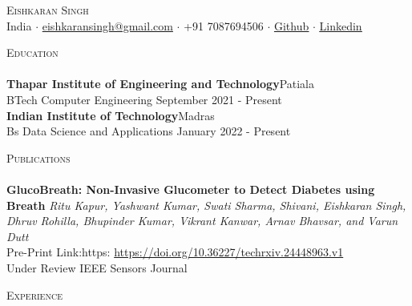 \documentclass[a4paper]{article}
\newcommand{\lineunder} {
    \vspace*{-8pt} \\
    \hspace*{-18pt} \hrulefill \\
}
\newcommand{\header} [1] {
    {\hspace*{-18pt}\vspace*{6pt} \textsc{#1}}
    \vspace*{-6pt} \lineunder
}
\begin{document}
\vspace*{-40pt}

    

\vspace*{-9pt}
\begin{center}
	{\Huge \scshape {Eishkaran Singh}}\\
	\vspace{1mm}
	India $\cdot$ \underline{eishkaransingh@gmail.com} $\cdot$ +91 7087694506 $\cdot$ \href{https://github.com/EISHKARAN}{\underline{Github}} $\cdot$ \href{https://www.linkedin.com/in/eishkaran-singh/}{\underline{Linkedin}} \\
\end{center}
\vspace{-2mm}
\header{Education}
\vspace{0.5mm}
\textbf{Thapar Institute of Engineering and Technology}\hfill Patiala\\
BTech Computer  Engineering \hfill September 2021 - Present\\
\vspace{0.5mm}
\textbf{Indian Institute of Technology}\hfill Madras\\
Bs Data Science and Applications \hfill January 2022 - Present\\
\vspace{-0.5mm}
\header{Publications}
\vspace{-0.5mm}
\textbf{GlucoBreath: Non-Invasive Glucometer to Detect Diabetes using Breath}
    {\textit{Ritu Kapur, Yashwant Kumar, Swati Sharma, Shivani, Eishkaran Singh, Dhruv Rohilla, Bhupinder Kumar, Vikrant Kanwar, Arnav Bhavsar, and Varun Dutt}}\\
\vspace{0.5 mm}
Pre-Print Link:https: \url{https://doi.org/10.36227/techrxiv.24448963.v1} \\
Under Review IEEE Sensors Journal\\
\vspace{-0.5 mm}
\header{Experience}
\vspace{-1mm}
\end{document}
